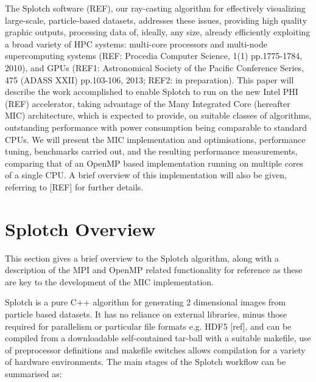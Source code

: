 \documentclass{easychair}
\begin{document}
The Splotch software (REF), our ray-casting algorithm for
effectively visualizing large-scale, particle-based datasets, addresses these issues, 
providing high quality graphic outputs, processing data of, ideally, any size, already
efficiently exploiting a broad variety of HPC systems: multi-core processors and multi-node supercomputing systems (REF: Procedia Computer Science, 1(1) pp.1775-1784, 2010), and GPUs (REF1: Astronomical Society of the Pacific Conference Series, 475 (ADASS XXII) pp.103-106, 2013; REF2: in preparation). 
This paper will describe the work accomplished to enable Splotch to 
run on the new Intel PHI (REF) accelerator, taking advantage of the Many Integrated Core (hereafter MIC) architecture,
which is expected to provide, on suitable classes of algorithms, outstanding performance 
with power consumption being comparable to standard CPUs. 
We will present the MIC implementation and optimisations, performance tuning,
benchmarks carried out, and the resulting performance measurements, comparing that of an OpenMP
based implementation running on multiple cores of a single CPU. 
A brief overview of this implementation will also be given, referring to [REF] for further details.

\section{Splotch Overview}
\label{sect:overview}

This section gives a brief overview to the Splotch algorithm, along with a description of the MPI and OpenMP related 
functionality for reference as these are key to the development of the MIC implementation.

Splotch is a pure C++ algorithm for generating 2 dimensional images from particle based datasets. It has no reliance 
on external libraries, minus those required for parallelism or particular file formats e.g. HDF5 [ref], and can be 
compiled from a downloadable self-contained tar-ball with a suitable makefile, use of preprocessor definitions and 
makefile switches allows compilation for a variety of hardware environments. The main stages of the Splotch workflow 
can be summarised as:
\end{document}
